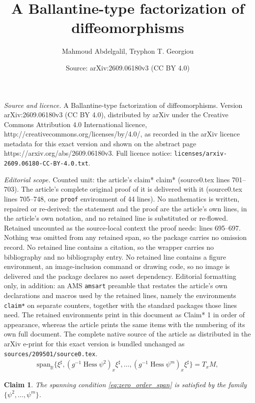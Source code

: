 \documentclass[10pt,a4paper]{amsart}
\title{A Ballantine-type factorization of diffeomorphisms}
\author{Mahmoud Abdelgalil, Tryphon T. Georgiou}
\date{Source: arXiv:2609.06180v3 (CC BY 4.0)}
\newtheorem{claim*}{Claim}
\DeclareMathOperator{\Hess}{Hess}
\newcommand{\M}{M}
\begin{document}
\maketitle

\noindent\emph{Source and licence.} A Ballantine-type factorization of diffeomorphisms. Version arXiv:2609.06180v3 (CC BY 4.0), distributed by arXiv under the Creative Commons Attribution 4.0 International licence, http://creativecommons.org/licenses/by/4.0/, as recorded in the arXiv licence metadata for this exact version and shown on the abstract page https://arxiv.org/abs/2609.06180v3. Full licence notice: \texttt{licenses/arxiv-2609.06180-CC-BY-4.0.txt}.\par\smallskip

\noindent\textit{Editorial scope.} Counted unit: the article's claim* claim* (source0.tex lines 701--703). The article's complete original proof of it is delivered with it (source0.tex lines 705--748, one \texttt{proof} environment of 44 lines). No mathematics is written, repaired or re-derived: the statement and the proof are the article's own lines, in the article's own notation, and no retained line is substituted or re-flowed.  Retained uncounted as the source-local context the proof needs: lines 695--697.  Nothing was omitted from any retained span, so the package carries no omission record.  No retained line contains a citation, so the wrapper carries no bibliography and no bibliography entry.  No retained line contains a figure environment, an image-inclusion command or drawing code, so no image is delivered and the package declares no asset dependency.  Editorial formatting only, in addition: an AMS \texttt{amsart} preamble that restates the article's own declarations and macros used by the retained lines, namely the environments \texttt{claim*} on separate counters, together with the standard packages those lines need.  The retained environments print in this document as Claim* 1 in order of appearance, whereas the article prints the same items with the numbering of its own full document.  The complete native source of the article as distributed in the arXiv e-print for this exact version is bundled unchanged as \texttt{sources/209501/source0.tex}.
\begin{align}\label{eq:zero_order_span}
    \mathrm{span}_{\mathbb{R}}\{\xi^\sharp,(g^{-1}\Hess\psi^2)_x\xi^\sharp,\dots,(g^{-1}\Hess\psi^{m})_x\xi^\sharp\}=T_x\M,
\end{align}

\begin{claim*}
    The spanning condition \eqref{eq:zero_order_span} is satisfied by the family $\{\psi^2,\dots,\psi^m\}$.
\end{claim*}
\end{document}
